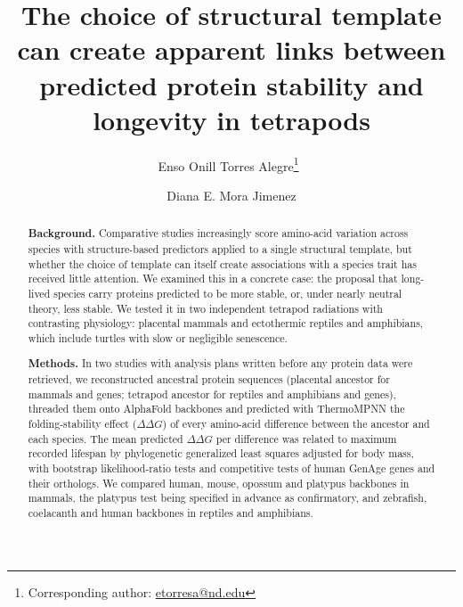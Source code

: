 \documentclass[11pt]{article}
\title{\textbf{The choice of structural template can create apparent links between predicted protein stability and longevity in tetrapods}}
\author{Enso Onill Torres Alegre\thanks{Corresponding author: \href{mailto:etorresa@nd.edu}{etorresa@nd.edu}}\ }
\author{Diana E. Mora Jimenez}
\affil{University of Notre Dame}
\date{}
\newcommand{\ddG}{$\Delta\Delta G$}
\begin{document}
\maketitle
\thispagestyle{fancy}

\begin{abstract}
\noindent\textbf{Background.} Comparative studies increasingly score amino-acid variation across species with structure-based predictors applied to a single structural template, but whether the choice of template can itself create associations with a species trait has received little attention. We examined this in a concrete case: the proposal that long-lived species carry proteins predicted to be more stable, or, under nearly neutral theory, less stable. We tested it in two independent tetrapod radiations with contrasting physiology: placental mammals and ectothermic reptiles and amphibians, which include turtles with slow or negligible senescence.

\noindent\textbf{Methods.} In two studies with analysis plans written before any protein data were retrieved, we reconstructed ancestral protein sequences (placental ancestor for \MNSpecies{} mammals and \MNGenes{} genes; tetrapod ancestor for \RNSpecies{} reptiles and amphibians and \RNGenes{} genes), threaded them onto AlphaFold backbones and predicted with ThermoMPNN the folding-stability effect (\ddG) of every amino-acid difference between the ancestor and each species. The mean predicted \ddG{} per difference was related to maximum recorded lifespan by phylogenetic generalized least squares adjusted for body mass, with bootstrap likelihood-ratio tests and competitive tests of human GenAge genes and their orthologs. We compared human, mouse, opossum and platypus backbones in mammals, the platypus test being specified in advance as confirmatory, and zebrafish, coelacanth and human backbones in reptiles and amphibians.


\end{abstract}
\end{document}
